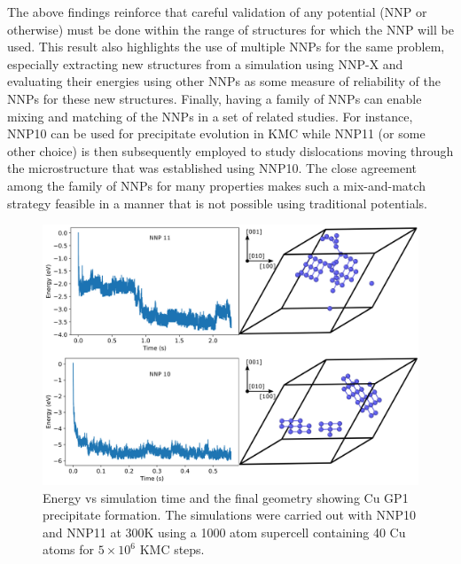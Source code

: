 \documentclass{article}
\begin{document}
The above findings reinforce that careful validation of any potential (NNP or otherwise) must be done within the range of structures for which the NNP will be used. This result also highlights the use of multiple NNPs for the same problem, especially extracting new structures from a simulation using NNP-X and evaluating their energies using other NNPs as some measure of reliability of the NNPs for these new structures.  Finally, having a family of NNPs can enable mixing and matching of the NNPs in a set of related studies.  For instance, NNP10 can be used for precipitate evolution in KMC while NNP11 (or some other choice) is then subsequently employed to study dislocations moving through the microstructure that was established using NNP10.  The close agreement among the family of NNPs for many properties makes such a mix-and-match strategy feasible in a manner that is not possible using traditional potentials.


\begin{figure}[H]
  \centering
  \includegraphics[width=6.5in]{kmcFigures/gp1.pdf}
  \caption{Energy vs simulation time and the final geometry showing Cu GP1 precipitate formation. The simulations were carried out with NNP10 and NNP11 at 300K using a 1000 atom supercell containing 40 Cu atoms for $5\times10^6$ KMC steps.
  }
  \label{fig:gp1}
\end{figure}
\end{document}
